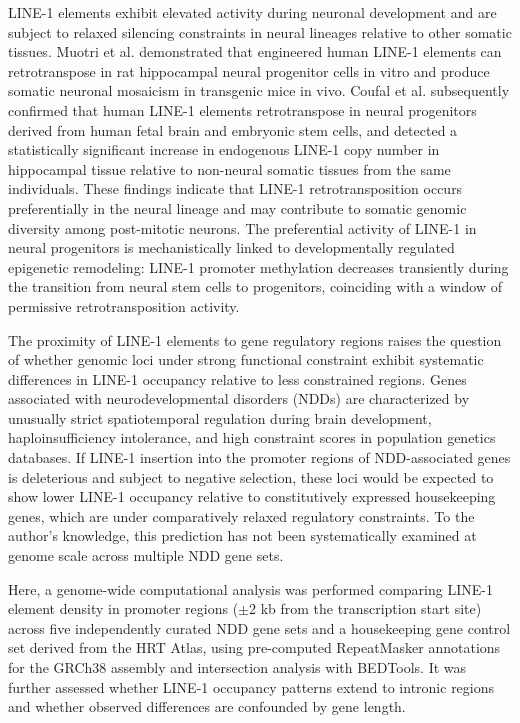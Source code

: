 \documentclass[preprints,briefreport,submit,pdftex,oneauthor]{Definitions/mdpi}
\begin{document}
LINE-1 elements exhibit elevated activity during neuronal
development and are subject to relaxed silencing constraints
in neural lineages relative to other somatic tissues.
Muotri et al. demonstrated that engineered human LINE-1 elements can
retrotranspose in rat hippocampal neural progenitor cells in
vitro and produce somatic neuronal mosaicism in transgenic mice
in vivo\cite{muotri2005}.
Coufal et al. subsequently confirmed
that human LINE-1 elements retrotranspose in neural progenitors
derived from human fetal brain and embryonic stem cells, and
detected a statistically significant increase in endogenous
LINE-1 copy number in hippocampal tissue relative to non-neural
somatic tissues from the same individuals\cite{coufal2009}.
These findings indicate that LINE-1 retrotransposition occurs
preferentially in the neural lineage and may contribute to
somatic genomic diversity among post-mitotic neurons\cite{singer2010}.
The preferential activity of LINE-1 in neural progenitors is
mechanistically linked to developmentally regulated epigenetic
remodeling: LINE-1 promoter methylation decreases transiently
during the transition from neural stem cells to progenitors,
coinciding with a window of permissive retrotransposition
activity\cite{muotri2005, jonsson2019}.

The proximity of LINE-1 elements to gene regulatory regions
raises the question of whether genomic loci under strong
functional constraint exhibit systematic differences in LINE-1
occupancy relative to less constrained regions. Genes
associated with neurodevelopmental disorders (NDDs) are
characterized by unusually strict spatiotemporal regulation
during brain development, haploinsufficiency intolerance, and
high constraint scores in population genetics databases.
If LINE-1 insertion into the promoter regions of NDD-associated
genes is deleterious and subject to negative selection, these
loci would be expected to show lower LINE-1 occupancy relative
to constitutively expressed housekeeping genes, which are under
comparatively relaxed regulatory constraints.
To the author's knowledge, this prediction has not been systematically examined at genome
scale across multiple NDD gene sets.

Here, a genome-wide computational analysis was performed comparing LINE-1 element
density in promoter regions ($\pm$2 kb from the transcription
start site) across five independently curated NDD gene sets and
a housekeeping gene control set derived from the HRT Atlas,
using pre-computed RepeatMasker annotations for the GRCh38
assembly and intersection analysis with BEDTools.
It was further assessed whether LINE-1 occupancy patterns extend to intronic
regions and whether observed differences are confounded by
gene length.
\end{document}
